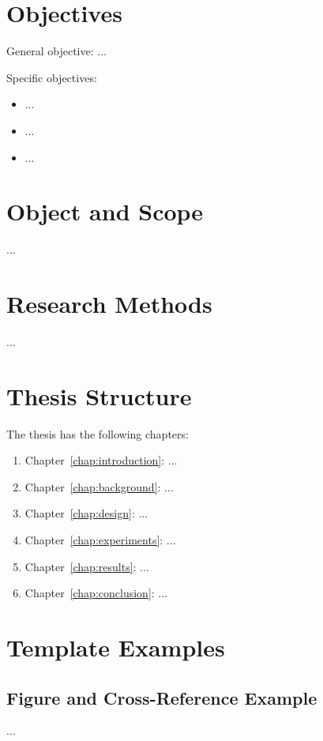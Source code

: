 \section{Objectives}
General objective: ...

Specific objectives:
\begin{itemize}
    \item ...
    \item ...
    \item ...
\end{itemize}

\section{Object and Scope}
...

\section{Research Methods}
...

\section{Thesis Structure}
The thesis has the following chapters:
\begin{enumerate}
    \item Chapter~\ref{chap:introduction}: ...
    \item Chapter~\ref{chap:background}: ...
    \item Chapter~\ref{chap:design}: ...
    \item Chapter~\ref{chap:experiments}: ...
    \item Chapter~\ref{chap:results}: ...
    \item Chapter~\ref{chap:conclusion}: ...
\end{enumerate}

\section{Template Examples}
\label{sec:template-ch1-introduction}

\subsection{Figure and Cross-Reference Example}
...

